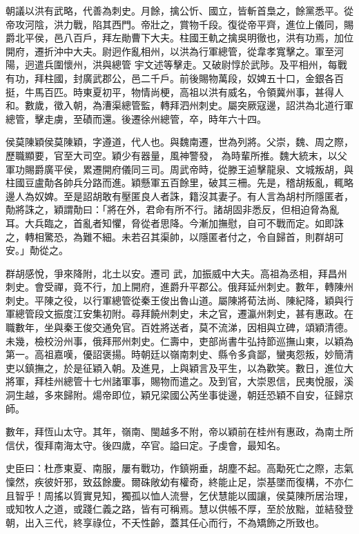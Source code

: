 \begin{pinyinscope}
 朝議以洪有武略，代善為刺史。月餘，擒公忻、國立，皆斬首梟之，餘黨悉平。從帝攻河陰，洪力戰，陷其西門。帝壯之，賞物千段。復從帝平齊，進位上儀同，賜爵北平侯，邑八百戶，拜左勛曹下大夫。柱國王軌之擒吳明徹也，洪有功焉，加位開府，遷折沖中大夫。尉迥作亂相州，以洪為行軍總管，從韋孝寬擊之。軍至河陽，迥遣兵圍懷州，洪與總管
 宇文述等擊走。又破尉惇於武陟。及平相州，每戰有功，拜柱國，封廣武郡公，邑二千戶。前後賜物萬段，奴婢五十口，金銀各百挺，牛馬百匹。時東夏初平，物情尚梗，高祖以洪有威名，令領冀州事，甚得人和。數歲，徵入朝，為漕渠總管監，轉拜泗州刺史。屬突厥寇邊，詔洪為北道行軍總管，擊走虜，至磧而還。後遷徐州總管，卒，時年六十四。



 侯莫陳穎侯莫陳穎，字遵道，代人也。與魏南遷，世為列將。父崇，魏、周之際，歷職顯要，官至大司空。穎少有器量，風神警發，
 為時輩所推。魏大統末，以父軍功賜爵廣平侯，累遷開府儀同三司。周武帝時，從滕王逌擊龍泉、文城叛胡，與柱國豆盧勣各帥兵分路而進。穎懸軍五百餘里，破其三柵。先是，稽胡叛亂，輒略邊人為奴婢。至是詔胡敢有壓匿良人者誅，籍沒其妻子。有人言為胡村所隱匿者，勣將誅之，穎謂勣曰：「將在外，君命有所不行。諸胡固非悉反，但相迫脅為亂耳。大兵臨之，首亂者知懼，脅從者思降。今漸加撫慰，自可不戰而定。如即誅之，轉相驚恐，為難不細。未若召其渠帥，以隱匿者付之，令自歸首，則群胡可安。」勣從之。



 群胡感悅，爭來降附，北土以安。遷司
 武，加振威中大夫。高祖為丞相，拜昌州刺史。會受禪，竟不行，加上開府，進爵升平郡公。俄拜延州刺史。數年，轉陳州刺史。平陳之役，以行軍總管從秦王俊出魯山道。屬陳將荀法尚、陳紀降，穎與行軍總管段文振度江安集初附。尋拜饒州刺史，未之官，遷瀛州刺史，甚有惠政。在職數年，坐與秦王俊交通免官。百姓將送者，莫不流涕，因相與立碑，頌穎清德。未幾，檢校汾州事，俄拜邢州刺史。仁壽中，吏部尚書牛弘持節巡撫山東，以穎為第一。高祖嘉嘆，優詔褒揚。時朝廷以嶺南刺史、縣令多貪鄙，蠻夷怨叛，妙簡清吏以鎮撫之，於是征穎入朝。及進見，上與穎言及平生，以為歡笑。數日，進位大將軍，拜桂州總管十七州諸軍事，賜物而遣之。及到官，大崇恩信，民夷悅服，溪洞生越，多來歸附。煬帝即位，穎兄梁國公芮坐事徙邊，朝廷恐穎不自安，征歸京師。



 數年，拜恆山太守。其年，嶺南、閩越多不附，帝以穎前在桂州有惠政，為南土所信伏，復拜南海太守。後四歲，卒官。謚曰定。子虔會，最知名。



 史臣曰：杜彥東夏、南服，屢有戰功，作鎮朔垂，胡塵不起。高勱死亡之際，志氣懍然，疾彼奸邪，致茲餘慶。爾硃敞幼有權奇，終能止足，崇基墜而復構，不亦仁且智乎！周搖以質實見知，獨孤以恤人流譽，乞伏慧能以國讓，侯莫陳所居治理，或知牧人之道，或踐仁義之路，皆有可稱焉。慧以供帳不厚，至於放黜，並結發登朝，出入三代，終享祿位，不夭性齡，蓋其任心而行，不為矯飾之所致也。



\end{pinyinscope}